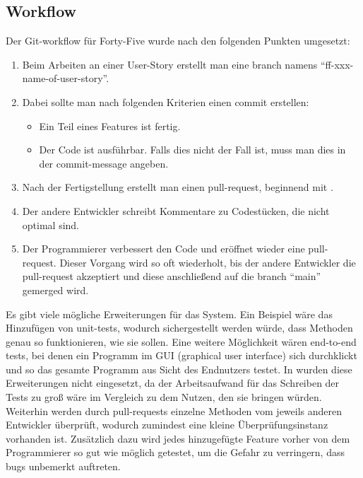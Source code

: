 \renewcommand{\kapitelautor}{Autor: Felix Zwickelstorfer}
\subsection{Workflow}\label{subsec:workflow}

Der Git-workflow für Forty-Five wurde nach den folgenden Punkten umgesetzt:
\begin{enumerate}
    \item Beim Arbeiten an einer User-Story erstellt man eine branch namens ``ff-xxx-name-of-user-story''.
    \item Dabei sollte man nach folgenden Kriterien einen commit erstellen:
    \begin{itemize}
        \item Ein Teil eines Features ist fertig.
        \item Der Code ist ausführbar.
        Falls dies nicht der Fall ist, muss man dies in der commit-message angeben.
    \end{itemize}
    \item Nach der Fertigstellung erstellt man einen pull-request, beginnend mit \quoted{[ff-xxx]}.
    \item Der andere Entwickler schreibt Kommentare zu Codestücken, die nicht optimal sind.
    \item Der Programmierer verbessert den Code und eröffnet wieder eine pull-request.
    Dieser Vorgang wird so oft wiederholt, bis der andere Entwickler die pull-request akzeptiert und diese anschließend auf die branch ``main'' gemerged wird.
\end{enumerate}

Es gibt viele mögliche Erweiterungen für das System.
Ein Beispiel wäre das Hinzufügen von unit-tests, wodurch sichergestellt werden würde, dass Methoden genau so funktionieren, wie sie sollen.
Eine weitere Möglichkeit wären end-to-end tests, bei denen ein Programm im GUI (graphical user interface) sich durchklickt und so das gesamte Programm aus Sicht des Endnutzers testet.
In \FF wurden diese Erweiterungen nicht eingesetzt, da der Arbeitsaufwand für das Schreiben der Tests zu groß wäre im Vergleich zu dem Nutzen, den sie bringen würden.
Weiterhin werden durch pull-requests einzelne Methoden vom jeweils anderen Entwickler überprüft, wodurch zumindest eine kleine Überprüfungsinstanz vorhanden ist.
Zusätzlich dazu wird jedes hinzugefügte Feature vorher von dem Programmierer so gut wie möglich getestet, um die Gefahr zu verringern, dass bugs unbemerkt auftreten.
